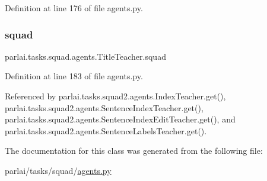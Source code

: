 Definition at line 176 of file agents.\+py.

\mbox{\label{classparlai_1_1tasks_1_1squad_1_1agents_1_1TitleTeacher_a416d2c1d7eb4e93ba1dc213cba6d2d26}} 
\subsubsection{\texorpdfstring{squad}{squad}}
{\footnotesize\ttfamily parlai.\+tasks.\+squad.\+agents.\+Title\+Teacher.\+squad}



Definition at line 183 of file agents.\+py.



Referenced by parlai.\+tasks.\+squad2.\+agents.\+Index\+Teacher.\+get(), parlai.\+tasks.\+squad2.\+agents.\+Sentence\+Index\+Teacher.\+get(), parlai.\+tasks.\+squad2.\+agents.\+Sentence\+Index\+Edit\+Teacher.\+get(), and parlai.\+tasks.\+squad2.\+agents.\+Sentence\+Labels\+Teacher.\+get().



The documentation for this class was generated from the following file\+:\begin{DoxyCompactItemize}
\item 
parlai/tasks/squad/\hyperlink{parlai_2tasks_2squad_2agents_8py}{agents.\+py}\end{DoxyCompactItemize}
